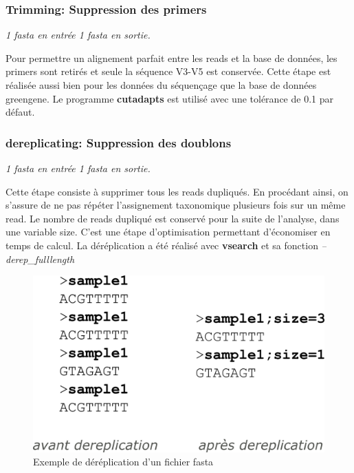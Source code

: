 \documentclass[12pt,a4paper]{article}
\begin{document}
\subsubsection{Trimming: Suppression des primers} \begin{center}\emph{1 fasta en entrée 1 fasta en sortie. } \end{center}

Pour permettre un alignement parfait entre les reads et la base de données, les primers sont retirés et seule la séquence V3-V5 est conservée. Cette étape est réalisée aussi bien pour les données du séquençage que  la base de données greengene.  
Le programme \textbf{cutadapts} est utilisé avec une tolérance de 0.1 par défaut. 

\subsubsection{dereplicating: Suppression des doublons}\begin{center}\emph{1 fasta en entrée 1 fasta en sortie. } \end{center}

Cette étape consiste à supprimer tous les reads dupliqués. En procédant ainsi, on s'assure de ne pas répéter l'assignement taxonomique plusieurs fois sur un même read. Le nombre de reads dupliqué est conservé pour la suite de l'analyse, dans une variable size. C'est une étape d'optimisation permettant d'économiser en temps de calcul. La déréplication a été réalisé avec \textbf{vsearch} et sa fonction \textit{--derep\_fulllength }

\begin{figure}[ht]
\begin{center}
\includegraphics[scale=0.4]{img/dereplication.png}\hfill
\end{center}
\caption{Exemple de déréplication d'un fichier fasta}
\label{dag}
\end{figure}
\end{document}
